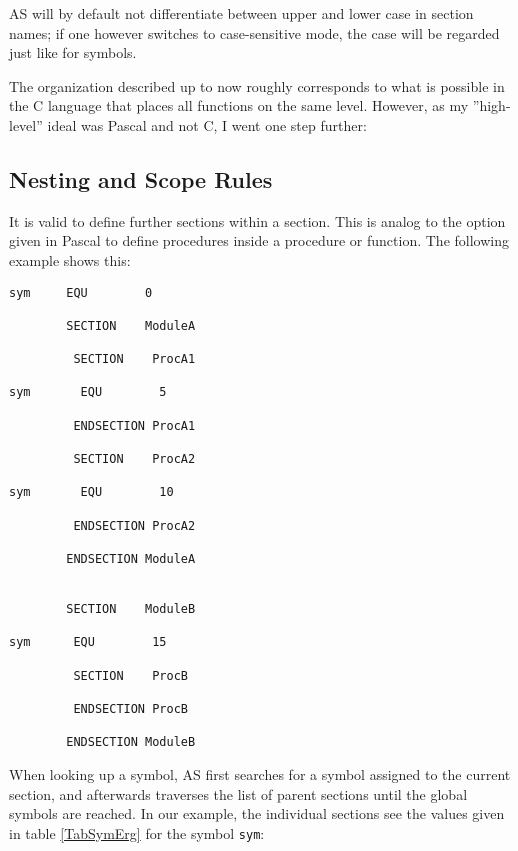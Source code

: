 \documentclass[12pt,twoside]{report}
\newcommand{\tty}[1]{{\tt #1}}
\newcommand{\asname}{{AS}}
\begin{document}
\asname{} will by default not differentiate between upper and lower case in
section names; if one however switches to case-sensitive mode, the
case will be regarded just like for symbols.

The organization described up to now roughly corresponds to what is
possible in the C language that places all functions on the same
level.  However, as my ''high-level'' ideal was Pascal and not C, I
went one step further:


\subsection{Nesting and Scope Rules}

It is valid to define further sections within a section.  This is
analog to the option given in Pascal to define procedures inside a
procedure or function.  The following example shows this:
\begin{verbatim}
sym     EQU        0

        SECTION    ModuleA

         SECTION    ProcA1

sym       EQU        5

         ENDSECTION ProcA1

         SECTION    ProcA2

sym       EQU        10

         ENDSECTION ProcA2

        ENDSECTION ModuleA


        SECTION    ModuleB

sym      EQU        15

         SECTION    ProcB

         ENDSECTION ProcB

        ENDSECTION ModuleB
\end{verbatim}
When looking up a symbol, \asname{} first searches for a symbol assigned to
the current section, and afterwards traverses the list of parent
sections until the global symbols are reached.  In our example, the
individual sections see the values given in table \ref{TabSymErg} for
the symbol \tty{sym}:
\end{document}
